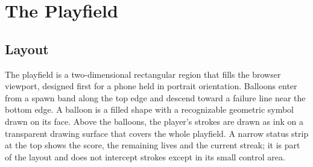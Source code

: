 \chapter{The Playfield}\label{ch:playfield}

\section{Layout}

The playfield is a two-dimensional rectangular region that fills the browser viewport, designed first for a phone held in portrait orientation. Balloons enter from a spawn band along the top edge and descend toward a failure line near the bottom edge. A balloon is a filled shape with a recognizable geometric symbol drawn on its face. Above the balloons, the player's strokes are drawn as ink on a transparent drawing surface that covers the whole playfield. A narrow status strip at the top shows the score, the remaining lives and the current streak; it is part of the layout and does not intercept strokes except in its small control area.

